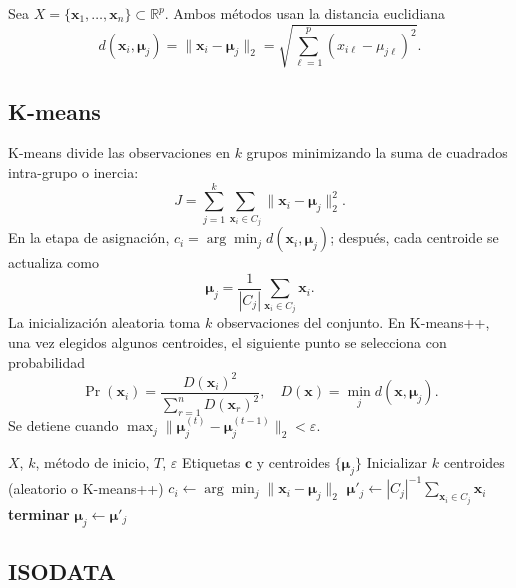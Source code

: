 \documentclass[10pt,twocolumn]{article}
\begin{document}
Sea $X=\{\bm{x}_1,\ldots,\bm{x}_n\}\subset\mathbb{R}^p$. Ambos métodos usan
la distancia euclidiana
\begin{equation}
 d(\bm{x}_i,\bm{\mu}_j)
 =\lVert\bm{x}_i-\bm{\mu}_j\rVert_2
 =\sqrt{\sum_{\ell=1}^{p}(x_{i\ell}-\mu_{j\ell})^2}.
 \label{eq:distancia}
\end{equation}

\subsection{K-means}

K-means divide las observaciones en $k$ grupos minimizando la suma de
cuadrados intra-grupo o inercia:
\begin{equation}
 J=\sum_{j=1}^{k}\sum_{\bm{x}_i\in C_j}
 \lVert\bm{x}_i-\bm{\mu}_j\rVert_2^2.
 \label{eq:inercia}
\end{equation}
En la etapa de asignación,
$c_i=\arg\min_j d(\bm{x}_i,\bm{\mu}_j)$; después, cada centroide se actualiza
como
\begin{equation}
 \bm{\mu}_j=\frac{1}{|C_j|}\sum_{\bm{x}_i\in C_j}\bm{x}_i.
 \label{eq:centroide}
\end{equation}
La inicialización aleatoria toma $k$ observaciones del conjunto. En K-means++,
una vez elegidos algunos centroides, el siguiente punto se selecciona con
probabilidad
\begin{equation}
 \Pr(\bm{x}_i)=\frac{D(\bm{x}_i)^2}
 {\sum_{r=1}^{n}D(\bm{x}_r)^2},
 \quad D(\bm{x})=\min_j d(\bm{x},\bm{\mu}_j).
 \label{eq:kpp}
\end{equation}
Se detiene cuando
$\max_j\lVert\bm{\mu}_j^{(t)}-\bm{\mu}_j^{(t-1)}\rVert_2<\varepsilon$.

\begin{algorithm}[H]
\small
\caption{K-means}
\label{alg:kmeans}
\begin{algorithmic}[1]
\Require $X$, $k$, método de inicio, $T$, $\varepsilon$
\Ensure Etiquetas $\bm{c}$ y centroides $\{\bm{\mu}_j\}$
\State Inicializar $k$ centroides (aleatorio o K-means++)
  \State $c_i\gets\arg\min_j\lVert\bm{x}_i-\bm{\mu}_j\rVert_2$
  \State $\bm{\mu}'_j\gets |C_j|^{-1}\sum_{\bm{x}_i\in C_j}\bm{x}_i$
    \State \textbf{terminar}
  \EndIf
  \State $\bm{\mu}_j\gets\bm{\mu}'_j$
\EndFor
\end{algorithmic}
\end{algorithm}

\subsection{ISODATA}
\end{document}

